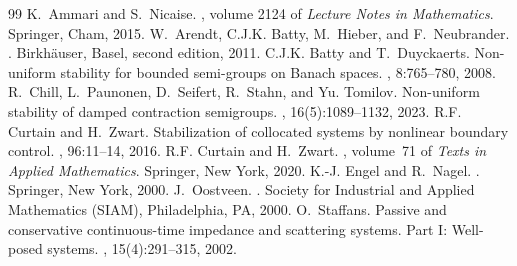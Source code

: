 \documentclass[10pt,a4paper]{amsart}
\begin{document}
\begin{thebibliography}{99}
 K.~Ammari and S.~Nicaise. , volume 2124 of {\em Lecture Notes in Mathematics}. \newblock Springer, Cham, 2015.
 W.~Arendt, C.J.K. Batty, M.~Hieber, and F.~Neubrander. . \newblock Birkh{\"a}user, Basel, second edition, 2011.
 C.J.K. Batty and T.~Duyckaerts. \newblock Non-uniform stability for bounded semi-groups on {B}anach spaces. , 8:765--780, 2008.
 R.~{Chill}, L.~{Paunonen}, D.~{Seifert}, R.~{Stahn}, and Yu. {Tomilov}. \newblock Non-uniform stability of damped contraction semigroups. , 16(5):1089--1132, 2023.
 R.F. Curtain and H.~Zwart. \newblock Stabilization of collocated systems by nonlinear boundary control. , 96:11--14, 2016.
 R.F. Curtain and H.~Zwart. , volume~71 of {\em Texts in Applied Mathematics}. \newblock Springer, New York, 2020.
 K.-J. Engel and R.~Nagel. . \newblock Springer, New York, 2000.
 J.~Oostveen. . \newblock Society for Industrial and Applied Mathematics (SIAM), Philadelphia, PA, 2000.
 O.~Staffans. \newblock Passive and conservative continuous-time impedance and scattering systems. {Part I}: {W}ell-posed systems. , 15(4):291--315, 2002.
\end{thebibliography}
\end{document}
